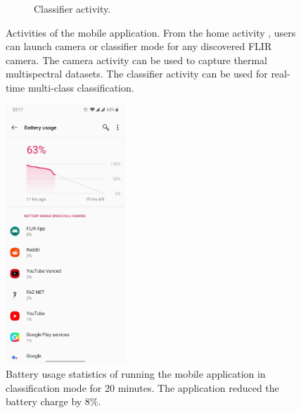 \documentclass{l4proj}
\begin{document}
\begin{appendices}
\begin{figure}[ht]
\begin{subfigure}[h!]{0.32\textwidth}
    \caption{Classifier activity.}
    \label{fig:app_activities_classifier}
  \end{subfigure}
  \caption{Activities of the mobile application. From the home activity , users can launch camera or classifier mode for any discovered FLIR camera. The camera activity  can be used to capture thermal multispectral datasets. The classifier activity  can be used for real-time multi-class classification.}
  \label{fig:app_activities}
\end{figure}

\begin{figure}[ht]
  \centering
  \includegraphics[width=0.4\textwidth, trim={0cm 32cm 0cm 0cm}, clip]{images/app/battery}
  \caption{Battery usage statistics of running the mobile application in classification mode for 20 minutes. The application reduced the battery charge by $8\%$.}
  \label{fig:app_battery}
\end{figure}


\end{appendices}






\end{document}
